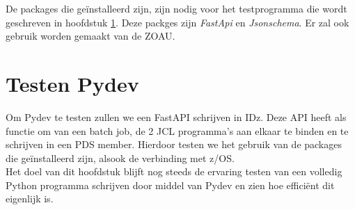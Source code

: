 De packages die geïnstalleerd zijn, zijn nodig voor het testprogramma die wordt geschreven in hoofdstuk \ref{ch:test-pydev}. Deze packges zijn \textit{FastApi} en \textit{Jsonschema}. Er zal ook gebruik worden gemaakt van de ZOAU.

\chapter{Testen Pydev}
\label{ch:test-pydev}

Om Pydev te testen zullen we een FastAPI schrijven in IDz. Deze API heeft als functie om van een batch job, de 2 JCL programma's aan elkaar te binden en te schrijven in een PDS member. Hierdoor testen we het gebruik van de packages die geïnstalleerd zijn, alsook de verbinding met z/OS. \\

Het doel van dit hoofdstuk blijft nog steeds de ervaring testen van een volledig Python programma schrijven door middel van Pydev en zien hoe efficiënt dit eigenlijk is.

